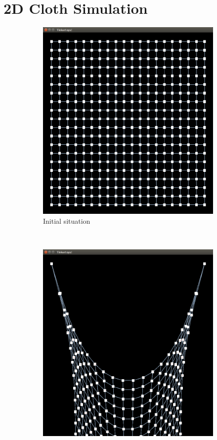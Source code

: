 \documentclass[a4paper,twoside,11pt,twocolumn]{article}
\begin{document}
\section{2D Cloth Simulation}
\begin{figure}[t]
	\centering
	\begin{subfigure}[b]{0.35\textwidth}
		\includegraphics[width=\textwidth]{grid_start}
		\caption{Initial situation}
		\label{grid_start}
	\end{subfigure}
	~~
	\begin{subfigure}[b]{0.35\textwidth}
		\includegraphics[width=\textwidth]{grid_rest}

\end{subfigure}
\end{figure}
\end{document}
